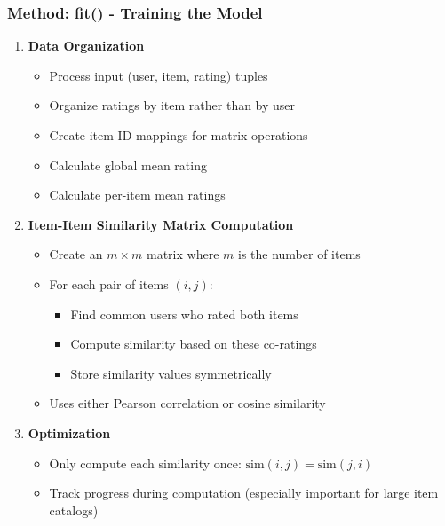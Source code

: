 \documentclass{beamer}
\begin{document}
\begin{frame}
\frametitle{Method: fit() - Training the Model}

\begin{enumerate}
    \item \textbf{Data Organization}
    \begin{itemize}
        \item Process input (user, item, rating) tuples
        \item Organize ratings by item rather than by user
        \item Create item ID mappings for matrix operations
        \item Calculate global mean rating
        \item Calculate per-item mean ratings
    \end{itemize}
    
    \item \textbf{Item-Item Similarity Matrix Computation}
    \begin{itemize}
        \item Create an $m \times m$ matrix where $m$ is the number of items
        \item For each pair of items $(i,j)$:
        \begin{itemize}
            \item Find common users who rated both items
            \item Compute similarity based on these co-ratings
            \item Store similarity values symmetrically
        \end{itemize}
        \item Uses either Pearson correlation or cosine similarity
    \end{itemize}
    
    \item \textbf{Optimization}
    \begin{itemize}
        \item Only compute each similarity once: $\text{sim}(i,j) = \text{sim}(j,i)$
        \item Track progress during computation (especially important for large item catalogs)
    \end{itemize}
\end{enumerate}
\end{frame}
\end{document}
